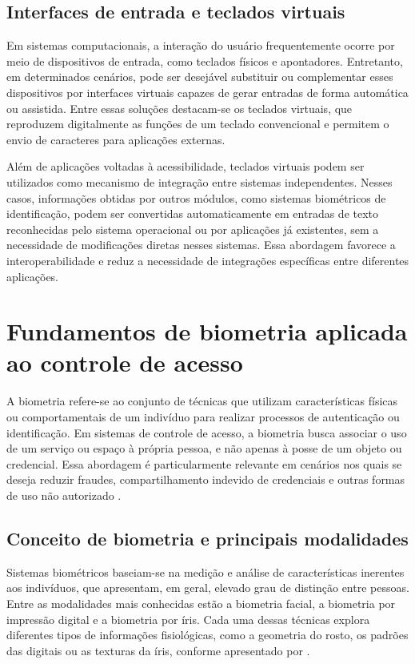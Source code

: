 \subsection{Interfaces de entrada e teclados virtuais}

Em sistemas computacionais, a interação do usuário frequentemente ocorre por meio de dispositivos de entrada, como teclados físicos e apontadores. Entretanto, em determinados cenários, pode ser desejável substituir ou complementar esses dispositivos por interfaces virtuais capazes de gerar entradas de forma automática ou assistida. Entre essas soluções destacam-se os teclados virtuais, que reproduzem digitalmente as funções de um teclado convencional e permitem o envio de caracteres para aplicações externas.

Além de aplicações voltadas à acessibilidade, teclados virtuais podem ser utilizados como mecanismo de integração entre sistemas independentes. Nesses casos, informações obtidas por outros módulos, como sistemas biométricos de identificação, podem ser convertidas automaticamente em entradas de texto reconhecidas pelo sistema operacional ou por aplicações já existentes, sem a necessidade de modificações diretas nesses sistemas. Essa abordagem favorece a interoperabilidade e reduz a necessidade de integrações específicas entre diferentes aplicações.



\section{Fundamentos de biometria aplicada ao controle de acesso}

A biometria refere-se ao conjunto de técnicas que utilizam características físicas ou comportamentais de um indivíduo para realizar processos de autenticação ou identificação. Em sistemas de controle de acesso, a biometria busca associar o uso de um serviço ou espaço à própria pessoa, e não apenas à posse de um objeto ou credencial. Essa abordagem é particularmente relevante em cenários nos quais se deseja reduzir fraudes, compartilhamento indevido de credenciais e outras formas de uso não autorizado \cite{bolle2013guide}.

\subsection{Conceito de biometria e principais modalidades}

Sistemas biométricos baseiam-se na medição e análise de características inerentes aos indivíduos, que apresentam, em geral, elevado grau de distinção entre pessoas. Entre as modalidades mais conhecidas estão a biometria facial, a biometria por impressão digital e a biometria por íris. Cada uma dessas técnicas explora diferentes tipos de informações fisiológicas, como a geometria do rosto, os padrões das digitais ou as texturas da íris, conforme apresentado por \textcite{bolle2013guide}.

